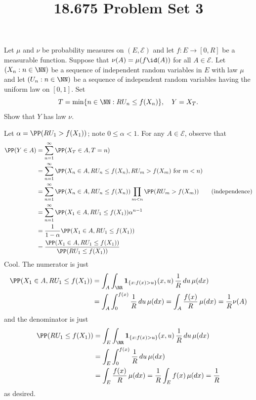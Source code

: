 \documentclass[11pt, headheight=30pt]{scrartcl}
\title{18.675 Problem Set 3}
\begin{document}
\section{}
\begin{prob*}
    Let $\mu$ and $\nu$ be probability measures on $(E, \mathscr{E})$ and let
    $f : E \to [0, R]$ be a measurable function. Suppose that
    $\nu(A) = \mu(f \id(A))$ for all $A \in \mathscr{E}$. Let
    $(X_n : n \in \NN)$ be a sequence of independent
    random variables in $E$ with law $\mu$ and let
    $(U_n : n \in \NN)$ be a sequence of independent random
    variables having the uniform law on $[0, 1]$. Set
    \[
        T = \min\{n \in \NN : RU_n \leq f(X_n)\}, \quad Y = X_T.
    \]
    Show that $Y$ has law $\nu$.
\end{prob*}

Let $\alpha = \PP(RU_1 > f(X_1))$; note $0\leq \alpha < 1$.
For any $A\in \mathscr{E}$, observe that
\begin{align*}
    \PP(Y\in A) &= \sum_{n = 1}^\infty \PP(X_T\in A, T = n) \\
    &= \sum_{n = 1}^\infty \PP(X_n\in A, RU_n \le f(X_n), RU_m > f(X_m) \text{ for } m < n) \\
    &= \sum_{n = 1}^\infty \PP(X_n\in A, RU_n \le f(X_n))\prod_{m < n} \PP(RU_m > f(X_m)) \tag{independence} \\
    &= \sum_{n = 1}^\infty \PP(X_1\in A, RU_1 \le f(X_1))\alpha^{n-1} \\
    &= \frac{1}{1-\alpha} \PP(X_1\in A, RU_1 \le f(X_1)) \\
    &= \frac{\PP(X_1\in A, RU_1 \le f(X_1))}{\PP(RU_1 \le f(X_1))}
\end{align*}
Cool. The numerator is just
\begin{align*}
    \PP(X_1\in A, RU_1 \le f(X_1)) &= \int_A \int_\RR \mathbf{1}_{\{x : f(x) > u\}}(x, u) \, \frac{1}{R} \, du \, \mu(dx)  \\
    &= \int_{A} \int_{0}^{f(x)} \frac{1}{R} \, du \, \mu(dx) = \int_{A} \frac{f(x)}{R} \, \mu(dx) = \frac{1}{R}\nu(A)
\end{align*}
and the denominator is just
\begin{align*}
    \PP(RU_1 \le f(X_1)) &= \int_E \int_\RR \mathbf{1}_{\{x : f(x) > u\}}(x, u) \, \frac{1}{R} \, du \, \mu(dx)  \\
    &= \int_{E} \int_{0}^{f(x)} \frac{1}{R} \, du \, \mu(dx) \\
    &= \int_{E} \frac{f(x)}{R} \, \mu(dx) = \frac{1}{R}\int_{E} f(x) \, \mu(dx)  = \frac{1}{R}
\end{align*}
as desired.
\end{document}
